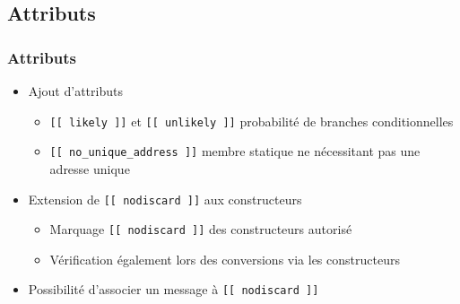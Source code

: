 \documentclass[C++.tex]{subfiles}
\begin{document}
\subsection*{Attributs}
\begin{frame}[fragile]
	\frametitle{Attributs}
	\begin{itemize}
		\item Ajout d'attributs
		\begin{itemize}
			\item \lstinline|[[ likely ]]| et \lstinline|[[ unlikely ]]| probabilité de branches conditionnelles


			\item \lstinline|[[ no_unique_address ]]| membre statique ne nécessitant pas une adresse unique

		\end{itemize}

		\item Extension de \lstinline|[[ nodiscard ]]| aux constructeurs
		\begin{itemize}
			\item Marquage \lstinline|[[ nodiscard ]]| des constructeurs autorisé


			\item Vérification également lors des conversions via les constructeurs

		\end{itemize}
		\item Possibilité d'associer un message à \lstinline|[[ nodiscard ]]|

	\end{itemize}
\end{frame}
\end{document}
